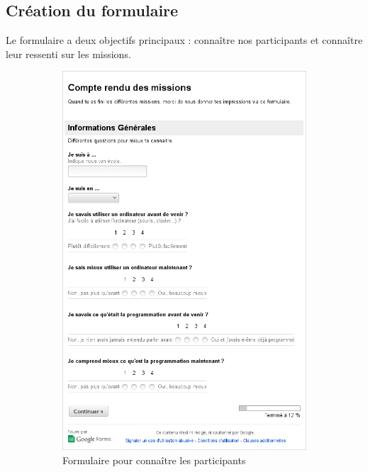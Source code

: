 \subsection{Création du formulaire}
Le formulaire a deux objectifs principaux : connaître nos participants et connaître leur ressenti sur les \glspl{mission}.
\begin{figure}%
  \begin{center}
    \begin{subfigure}[b]{.49\textwidth}
      \includegraphics[width=\textwidth]{content/8-validation/images/form-user}
      \caption{Formulaire pour connaître les participants}
    \end{subfigure}
    \begin{subfigure}[b]{.49\textwidth}

\end{subfigure}
\end{center}
\end{figure}
